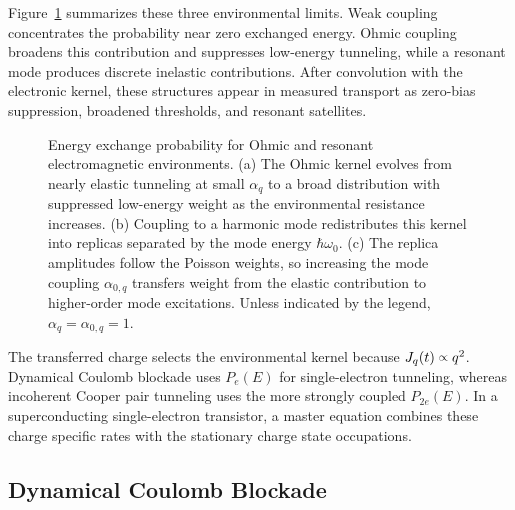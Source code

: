         Figure~\ref{fig:stochastic:pe} summarizes these three environmental limits. Weak coupling concentrates the probability near zero exchanged energy. Ohmic coupling broadens this contribution and suppresses low-energy tunneling, while a resonant mode produces discrete inelastic contributions. After convolution with the electronic kernel, these structures appear in measured transport as zero-bias suppression, broadened thresholds, and resonant satellites.

        \begin{figure}[t]
            \centering
            \hfill
            \hfill
            \caption{
                Energy exchange probability for Ohmic and resonant electromagnetic environments. (a) The Ohmic kernel evolves from nearly elastic tunneling at small $\alpha_q$ to a broad distribution with suppressed low-energy weight as the environmental resistance increases. (b) Coupling to a harmonic mode redistributes this kernel into replicas separated by the mode energy $\hbar\omega_0$. (c) The replica amplitudes follow the Poisson weights, so increasing the mode coupling $\alpha_{0,q}$ transfers weight from the elastic contribution to higher-order mode excitations. Unless indicated by the legend, $\alpha_q=\alpha_{0,q}=1$.
                }
            \label{fig:stochastic:pe}
        \end{figure}

        The transferred charge selects the environmental kernel because $J_q(t)\spropto q^2$. Dynamical Coulomb blockade uses $P_e(E)$ for single-electron tunneling, whereas incoherent Cooper pair tunneling uses the more strongly coupled $P_{2e}(E)$. In a superconducting single-electron transistor, a master equation combines these charge specific rates with the stationary charge state occupations.

    \subsection{Dynamical Coulomb Blockade}
    \label{subsec:stochastic:dcb}


